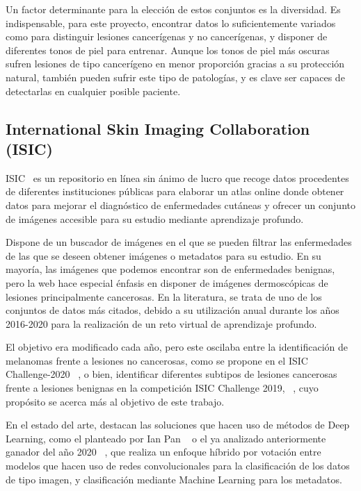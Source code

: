 Un factor determinante para la elección de estos conjuntos es la diversidad. Es indispensable, para este proyecto, encontrar datos lo suficientemente variados como para distinguir lesiones cancerígenas y no cancerígenas, y disponer de diferentes tonos de piel para entrenar. Aunque los tonos de piel más oscuras sufren lesiones de tipo cancerígeno en menor proporción gracias a su protección natural, también pueden sufrir este tipo de patologías, y es clave ser capaces de detectarlas en cualquier posible paciente.

\subsection{International Skin Imaging Collaboration​ (ISIC)}
ISIC~\cite{isicarchive} es un repositorio en línea sin ánimo de lucro que recoge datos procedentes de diferentes instituciones públicas para elaborar un atlas online donde obtener datos para mejorar el diagnóstico de enfermedades cutáneas y ofrecer un conjunto de imágenes accesible para su estudio mediante aprendizaje profundo.

Dispone de un buscador de imágenes en el que se pueden filtrar las enfermedades de las que se deseen obtener imágenes o metadatos para su estudio. En su mayoría, las imágenes que podemos encontrar son de enfermedades benignas, pero la web hace especial énfasis en disponer de imágenes dermoscópicas de lesiones principalmente cancerosas.  En la literatura, se trata de uno de los conjuntos de datos más citados, debido a su utilización anual durante los años 2016-2020 para la realización de un reto virtual de aprendizaje profundo. 

El objetivo era modificado cada año, pero este oscilaba entre la identificación de melanomas frente a lesiones no cancerosas, como se propone en el ISIC Challenge-2020 ~\cite{Rotemberg_2021}, o bien, identificar diferentes subtipos de lesiones cancerosas frente a lesiones benignas en la competición ISIC Challenge 2019, ~\cite{ham10000,codella2018skin,combalia2019bcn20000}, cuyo propósito se acerca más al objetivo de este trabajo.

En el estado del arte, destacan las soluciones que hacen uso de métodos de Deep Learning, como el planteado por Ian Pan ~\cite{2ndISIC} o el ya analizado anteriormente ganador del año 2020 ~\cite{1stISIC}, que realiza un enfoque híbrido por votación entre modelos que hacen uso de redes convolucionales para la clasificación de los datos de tipo imagen, y clasificación mediante Machine Learning para los metadatos.


